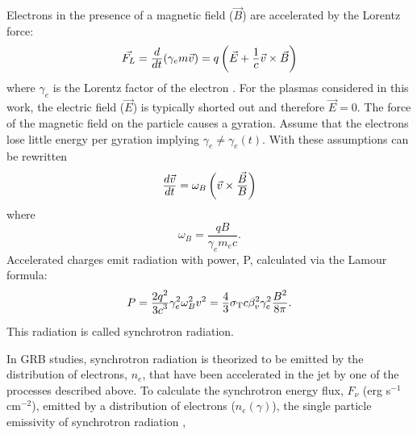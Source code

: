 Electrons in the presence of a magnetic field ($\vec{B}$) are accelerated by the Lorentz force:
\begin{equation}
\label{eq:FL}
  \vec{F_L}=\dover{d}{dt}(\gamma_e m \vec{v})=q\left(\vec{E} +\dover{1}{c} \vec{v}\times \vec{B} \right)
\end{equation}
where $\gamma_e$ is the Lorentz factor of the electron
\cite{rybicki:1979,jackson:1998}. For the plasmas considered in this
work, the electric field ($\vec{E}$) is typically shorted out and
therefore $\vec{E}=0$. The force of the magnetic field on the particle
causes a gyration.  Assume that the electrons lose little energy per
gyration implying $\gamma_e\neq \gamma_e(t)$. With these assumptions
 can be rewritten
 \begin{equation}
   \label{eq:FL2}
   \dover{d \vec{v}}{dt}=\omega_B\left( \vec{v} \times \dover{\vec{B}}{B} \right)
 \end{equation}
where
\begin{equation}
  \label{eq:cycfreq}
  \omega_B = \frac{qB}{\gamma_e m_e c}.
\end{equation}
Accelerated charges emit radiation with power, P, calculated via the Lamour formula:
\begin{equation}
  \label{eq:Psync}
  P=\dover{2 q^2}{3 c^3}\gamma_e^2\omega_B^2v^2=\dover{4}{3}\sigma_{\rm T}c\beta_v^2\gamma_e^2\dover{B^2}{8 \pi}.
\end{equation}
This radiation
is called synchrotron radiation. 

In GRB studies, synchrotron radiation is theorized to be emitted by
the distribution of electrons, $n_e$, that have been accelerated in
the jet by one of the processes described above. To calculate the
synchrotron energy flux, $F_{\nu}$ (erg s$^{-1}$ cm$^{-2}$), emitted
by a distribution of electrons ($n_e(\gamma)$), the single particle
emissivity of synchrotron radiation \cite{rybicki:1979},

